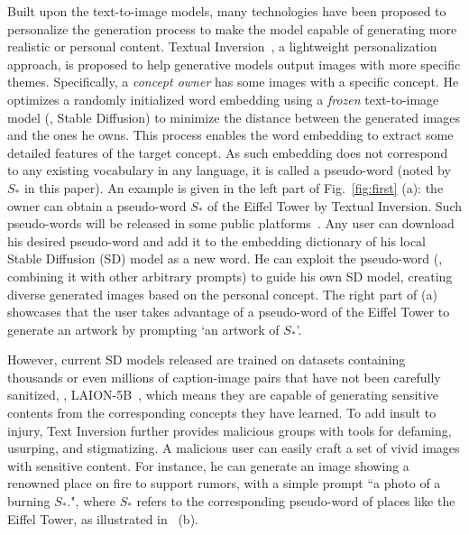 Built upon the text-to-image models, many technologies have been proposed to personalize the generation process to make the model capable of generating more realistic or personal content.
Textual Inversion~\cite{textual_inversion}, a lightweight personalization approach, is proposed to help generative models output images with more specific themes. 
Specifically, a \textit{concept owner} has some images with a specific concept. He optimizes a randomly initialized word embedding using a \textit{frozen} text-to-image model (\eg, Stable Diffusion) to minimize the distance between the generated images and the ones he owns. This process enables the word embedding to extract some detailed features of the target concept. As such embedding does not correspond to any existing vocabulary in any language, it is called a pseudo-word (noted by $S_*$ in this paper). An example is given in the left part of Fig.~\ref{fig:first} (a): the owner can obtain a pseudo-word $S_*$ of the Eiffel Tower by Textual Inversion.  Such pseudo-words will be released in some public platforms~\cite{civitai}. Any user can download his desired pseudo-word and add it to the embedding dictionary of his local Stable Diffusion (SD) model as a new word. He can exploit the pseudo-word (\eg, combining it with other arbitrary prompts) to guide his own SD model, creating diverse generated images based on the personal concept.  The right part of  (a) showcases that the user takes advantage of a pseudo-word of the Eiffel Tower to generate an artwork by prompting `an artwork of $S_*$'.



    
However, current SD models released are trained on datasets containing thousands or even millions of caption-image pairs that have not been carefully sanitized, \eg, LAION-5B~\cite{schuhmann2022laion}, which means they are capable of generating sensitive contents from the corresponding concepts they have learned.
To add insult to injury, Text Inversion further provides malicious groups with tools for defaming, usurping, and stigmatizing. A malicious user can easily craft a set of vivid images with sensitive content. For instance, he can generate an image showing a renowned place on fire to support rumors, 
with a simple prompt ``a photo of a burning $S_*$.", where $S_*$ refers to the corresponding pseudo-word of places like the Eiffel Tower, as illustrated in~ (b).

